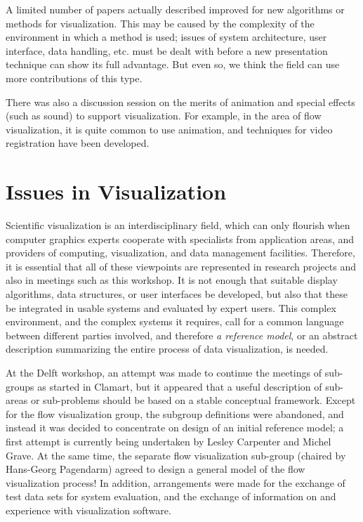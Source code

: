 \documentclass{egpubl}
\begin{document}
A limited number of papers actually described improved for new algorithms or
methods for visual\-ization\cite{Lev90,PorDuf84,RonRos96}. This may be caused
by the complexity of the environment in which a method is used; issues of
system architecture, user interface, data handling, etc. must be dealt with
before a new presentation technique can show its full advantage. But even so,
we think the field can use more contributions of this type.

There was also a discussion session on the merits of animation and special
effects (such as sound) to support visualization. For example, in the area of
flow visualization, it is quite common to use animation, and techniques for
video registration have been developed.

\section{Issues in Visualization}

Scientific visualization is an interdisciplinary field, which can only
flourish when computer graphics experts cooperate with specialists from
application areas, and providers of computing, visualization, and data
management facilities. Therefore, it is essential that all of these
viewpoints are represented in research projects and also in meetings such as
this workshop. It is not enough that suitable display algorithms, data
structures, or user interfaces be developed, but also that these be
integrated in usable systems and evaluated by expert users. This complex
environment, and the complex systems it requires, call for a common language
between different parties involved, and therefore \emph{a reference model}, or
an abstract description summarizing the entire process of data visualization,
is needed.

At the Delft workshop, an attempt was made to continue the meetings of
sub-groups as started in Clamart\cite{yll}, but it appeared that a useful
description of sub-areas or sub-problems should be based on a stable
conceptual framework. Except for the flow visualization group, the subgroup
definitions were abandoned, and instead it was decided to concentrate on
design of an initial reference model; a first attempt is currently being
undertaken by Lesley Carpenter and Michel Grave. At the same time, the
separate flow visualization sub-group (chaired by Hans-Georg Pagendarm)
agreed to design a general model of the flow visualization process! In
addition, arrangements were made for the exchange of test data sets for
system evaluation, and the exchange of information on and experience with
visualization software.
\end{document}
